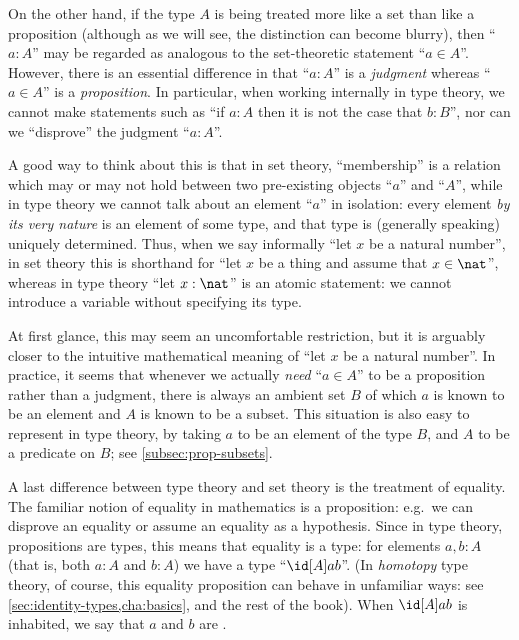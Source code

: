 On the other hand, if the type $A$ is being treated more like a set than like a proposition (although as we will see, the distinction can become blurry), then ``$a:A$'' may be regarded as analogous to the set-theoretic statement ``$a\in A$''.
However, there is an essential difference in that ``$a:A$'' is a \emph{judgment} whereas ``$a\in A$'' is a \emph{proposition}.
In particular, when working internally in type theory, we cannot make statements such as ``if $a:A$ then it is not the case that $b:B$'', nor can we ``disprove'' the judgment ``$a:A$''.

A good way to think about this is that in set theory, ``membership'' is a relation which may or may not hold between two pre-existing objects ``$a$'' and ``$A$'', while in type theory we cannot talk about an element ``$a$'' in isolation: every element \emph{by its very nature} is an element of some type, and that type is (generally speaking) uniquely determined.
Thus, when we say informally ``let $x$ be a natural number'', in set theory this is shorthand for ``let $x$ be a thing and assume that $x\in\nat$'', whereas in type theory ``let $x:\nat$'' is an atomic statement: we cannot introduce a variable without specifying its type.


At first glance, this may seem an uncomfortable restriction, but it is arguably closer to the intuitive mathematical meaning of ``let $x$ be a natural number''.
In practice, it seems that whenever we actually \emph{need} ``$a\in A$'' to be a proposition rather than a judgment, there is always an ambient set $B$ of which $a$ is known to be an element and $A$ is known to be a subset.
This situation is also easy to represent in type theory, by taking $a$ to be an element of the type $B$, and $A$ to be a predicate on $B$; see \cref{subsec:prop-subsets}.

A last difference between type theory and set theory is the treatment of equality.
The familiar notion of equality in mathematics is a proposition: e.g.\ we can disprove an equality or assume an equality as a hypothesis.
Since in type theory, propositions are types, this means that equality is a type: for elements $a,b:A$ (that is, both $a:A$ and $b:A$) we have a type ``$\id[A]ab$''.
(In \emph{homotopy} type theory, of course, this equality proposition can behave in unfamiliar ways: see \cref{sec:identity-types,cha:basics}, and the rest of the book).
When $\id[A]ab$ is inhabited, we say that $a$ and $b$ are .
%
%

